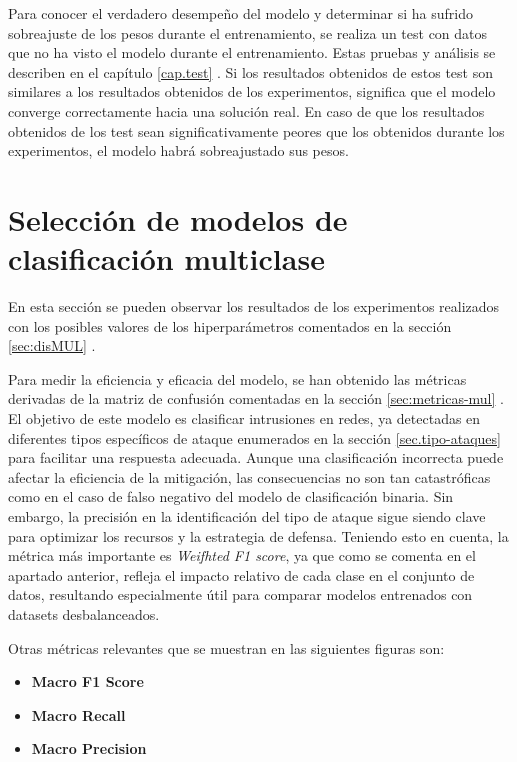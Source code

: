Para conocer el verdadero desempeño del modelo y determinar si ha sufrido sobreajuste de los pesos durante el entrenamiento, se realiza un test con datos que no ha visto el modelo durante el entrenamiento. Estas pruebas y análisis se describen en el capítulo \ref{cap.test} . Si los resultados obtenidos de estos test son similares a los resultados obtenidos de los experimentos, significa que el modelo converge correctamente hacia una solución real. En caso de que los resultados obtenidos de los test sean significativamente peores que los obtenidos durante los experimentos, el modelo habrá sobreajustado sus pesos. 



\section{Selección de modelos de clasificación multiclase}
En esta sección se pueden observar los resultados de los experimentos realizados con los posibles valores de los hiperparámetros comentados en la sección \ref{sec:disMUL} .

Para medir la eficiencia y eficacia del modelo, se han obtenido las métricas derivadas de la matriz de confusión comentadas en la sección \ref{sec:metricas-mul} . El objetivo de este modelo es clasificar intrusiones en redes, ya detectadas en diferentes tipos específicos de ataque enumerados en la sección \ref{sec.tipo-ataques} para facilitar una respuesta adecuada. Aunque una clasificación incorrecta puede afectar la eficiencia de la mitigación, las consecuencias no son tan catastróficas como en el caso de falso negativo del modelo de clasificación binaria. Sin embargo, la precisión en la identificación del tipo de ataque sigue siendo clave para optimizar los recursos y la estrategia de defensa.
Teniendo esto en cuenta, la métrica más importante es \textit{Weifhted F1 score}, ya que como se comenta en el apartado anterior, refleja el impacto relativo de cada clase en el conjunto de datos, resultando especialmente útil para comparar modelos entrenados con datasets desbalanceados.

Otras métricas relevantes que se muestran en las siguientes figuras son:
\begin{itemize}
	\item \textbf{Macro F1 Score}%
	\item \textbf{Macro Recall}%
	\item \textbf{Macro Precision}%
\end{itemize}

